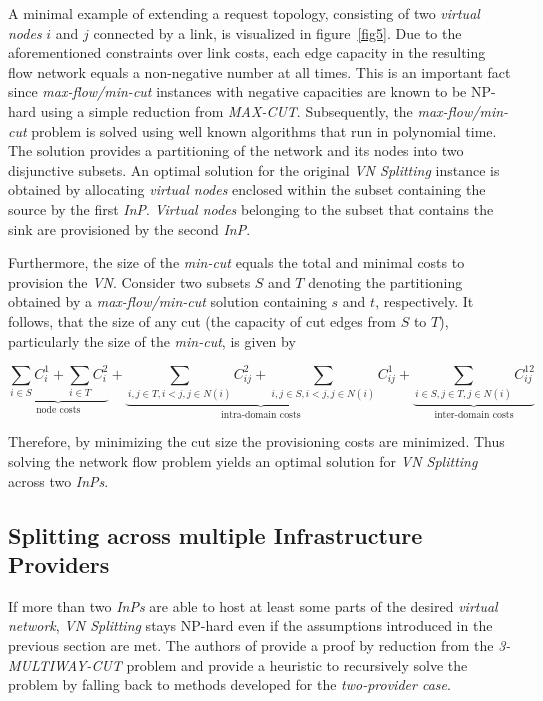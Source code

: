 \documentclass[prodmode,acmtomccap]{acmlarge}
\begin{document}
A minimal example of extending a request topology, consisting of two \emph{virtual nodes} $i$ and $j$ connected by a link, is visualized in figure~\ref{fig5}.
Due to the aforementioned constraints over link costs, each edge capacity in the resulting flow network equals a non-negative number at all times. This is an important fact since
\emph{max-flow/min-cut} instances with negative capacities are known to be NP-hard using a simple reduction from \emph{MAX-CUT}.
Subsequently, the \emph{max-flow/min-cut} problem is solved using well known algorithms that run in polynomial time. The solution provides a partitioning of the network and its nodes
into two disjunctive subsets. An optimal solution for the original \emph{VN Splitting} instance is obtained by allocating \emph{virtual nodes} enclosed within the subset containing the source by the first \emph{InP}.
\emph{Virtual nodes} belonging to the subset that contains the sink are provisioned by the second \emph{InP}.

Furthermore, the size of the \emph{min-cut} equals the total and minimal
costs to provision the \emph{VN}. Consider two subsets $S$ and $T$ denoting the partitioning obtained by a \emph{max-flow/min-cut} solution containing $s$ and $t$, respectively.
It follows, that the size of any cut (the capacity of cut edges from $S$ to $T$), particularly the size of the \emph{min-cut}, is given by

\normalsize

$$
	\underbrace{\sum\limits_{i \in S} C_i^1 + \sum\limits_{i \in T} C_i^2}_{\text{node costs}} + 
	\underbrace{\sum\limits_{i,j \in T, i < j, j \in N(i)} C_{ij}^2 + \sum\limits_{i,j \in S, i < j, j \in N(i)} C_{ij}^1}_{\text{intra-domain costs}}
	+\underbrace{\sum\limits_{i \in S, j \in T, j \in N(i)} C_{ij}^{12}}_{\text{inter-domain costs}}
$$

\small

Therefore, by minimizing the cut size the provisioning costs are minimized. Thus  solving the network flow problem yields an optimal solution for \emph{VN Splitting} across two \emph{InPs}.

\subsection{Splitting across multiple Infrastructure Providers}
If more than two \emph{InPs} are able to host at least some parts of the desired \emph{virtual network}, \emph{VN Splitting} stays NP-hard even if the assumptions introduced in the previous section are met.
The authors of  provide a proof by reduction from the \emph{3-MULTIWAY-CUT} problem and provide a heuristic to recursively solve the problem by falling back to methods developed
for the \emph{two-provider case}.
\end{document}
